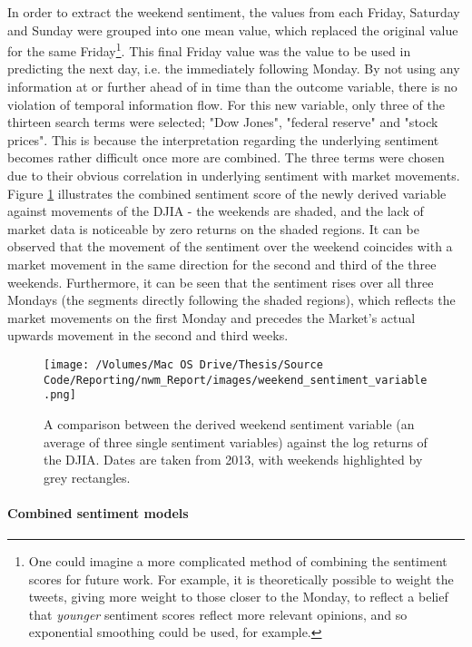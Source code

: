 \documentclass{article}
\begin{document}
In order to extract the weekend sentiment, the values from each Friday, Saturday and Sunday were grouped into one mean value, which replaced the original value for the same Friday\footnote{One could imagine a more complicated method of combining the sentiment scores for future work. For example, it is theoretically possible to weight the tweets, giving more weight to those closer to the Monday, to reflect a belief that \emph{younger} sentiment scores reflect more relevant opinions, and so exponential smoothing could be used, for example.}. This final Friday value was the value to be used in predicting the next day, i.e. the immediately following Monday. By not using any information at or further ahead of in time than the outcome variable, there is no violation of temporal information flow. For this new variable, only three of the thirteen search terms were selected; "Dow Jones", "federal reserve" and "stock prices". This is because the interpretation regarding the underlying sentiment becomes rather difficult once more are combined. The three terms were chosen due to their obvious correlation in underlying sentiment with market movements. Figure \ref{fig:wwp} illustrates the combined sentiment score of the newly derived variable against movements of the DJIA - the weekends are shaded, and the lack of market data is noticeable by zero returns on the shaded regions. It can be observed that the movement of the sentiment over the weekend coincides with a market movement in the same direction for the second and third of the three weekends. Furthermore, it can be seen that the sentiment rises over all three Mondays (the segments directly following the shaded regions), which reflects the market movements on the first Monday and precedes the Market's actual upwards movement in the second and third weeks.

\begin{figure}[htb]
\centering
\texttt{[image: /Volumes/Mac OS Drive/Thesis/Source Code/Reporting/nwm\_Report/images/weekend\_sentiment\_variable.png]}
\caption[An illustration of weekend sentiment as a predictor]{\label{fig:wwp}A comparison between the derived weekend sentiment variable (an average of three single sentiment variables) against the log returns of the DJIA. Dates are taken from 2013, with weekends highlighted by grey rectangles.}
\end{figure}


\paragraph{Combined sentiment models \label{combined-sent}}
\label{sec-1-2-3-2}
\end{document}
